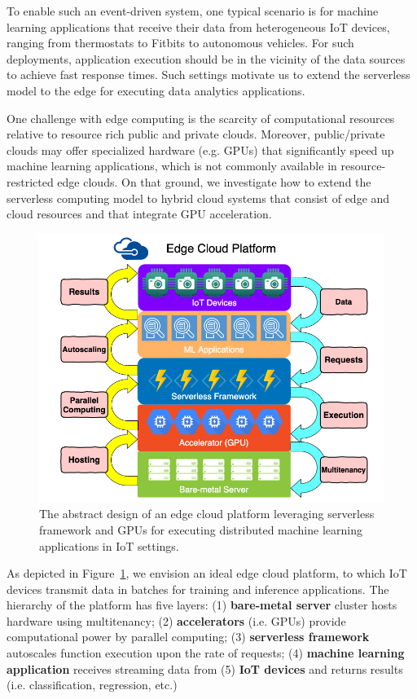 To enable such an event-driven system, one typical scenario is for machine learning applications that receive their data from heterogeneous IoT devices, ranging from thermostats to Fitbits to autonomous vehicles. For such deployments, application execution should be in the vicinity of the data sources to achieve fast response times. Such settings motivate us to extend the serverless model to the edge for executing data analytics applications.

One challenge with edge computing is the scarcity of computational resources relative to resource rich public and private clouds. Moreover, public/private clouds may offer specialized hardware (e.g. GPUs) that significantly speed up machine learning applications, which is not commonly available in resource-restricted edge clouds.
On that ground, we investigate how to extend the serverless computing model to hybrid cloud systems that consist of edge and cloud resources and that integrate GPU acceleration. 

\begin{figure}
    \centering
    \includegraphics[scale=0.3]{figures/edge_platform}
    \caption{The abstract design of an edge cloud platform leveraging serverless framework and GPUs for executing distributed machine learning applications in IoT settings.
\label{fig:edge}}
\end{figure}

As depicted in Figure~\ref{fig:edge}, we envision an ideal edge cloud platform, to which IoT devices transmit data in batches for training and inference applications. The hierarchy of the platform has five layers: (1) \textbf{bare-metal server} cluster hosts hardware using multitenancy; (2) \textbf{accelerators} (i.e. GPUs) provide computational power by parallel computing; (3) \textbf{serverless framework} autoscales function execution upon the rate of requests; (4) \textbf{machine learning application} receives streaming data from (5) \textbf{IoT devices} and returns results (i.e. classification, regression, etc.)

